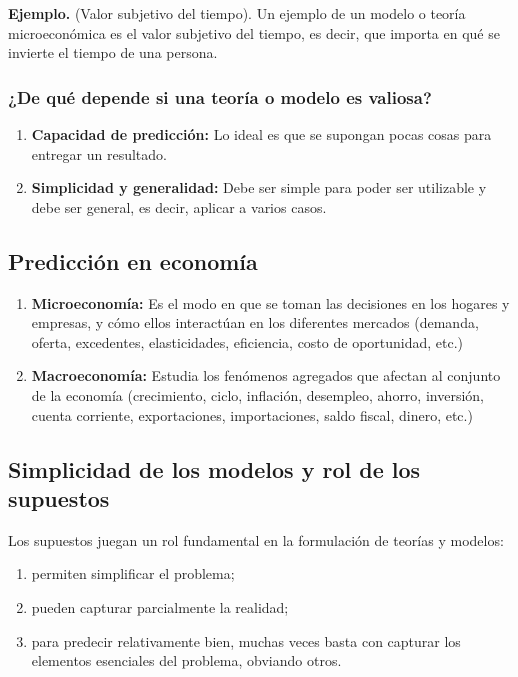 \documentclass{report}
\newenvironment{example}[1]{\noindent\setlength{\parskip}{0pt}\textbf{Ejemplo.} (#1).}{}
\begin{document}
\begin{example}{Valor subjetivo del tiempo}
Un ejemplo de un modelo o teoría microeconómica es el valor subjetivo del tiempo, es decir, que importa en qué se invierte el tiempo de una persona.
\end{example}

\subsubsection{¿De qué depende si una teoría o modelo es valiosa?}

\begin{enumerate}
\item \textbf{Capacidad de predicción:} Lo ideal es que se supongan pocas cosas para entregar un resultado.
\item \textbf{Simplicidad y generalidad:} Debe ser simple para poder ser utilizable y debe ser general, es decir, aplicar a varios casos.
\end{enumerate}

\subsection{Predicción en economía}

\begin{enumerate}
\item \textbf{Microeconomía:} Es el modo en que se toman las decisiones en los hogares y empresas, y cómo ellos interactúan en los diferentes mercados (demanda, oferta, excedentes, elasticidades, eficiencia, costo de oportunidad, etc.)
\item \textbf{Macroeconomía:} Estudia los fenómenos agregados que afectan al conjunto de la economía (crecimiento, ciclo, inflación, desempleo, ahorro, inversión, cuenta corriente, exportaciones, importaciones, saldo fiscal, dinero, etc.)
\end{enumerate}

\subsection{Simplicidad de los modelos y rol de los supuestos}

Los supuestos juegan un rol fundamental en la formulación de teorías y modelos:
\setlength{\parskip}{0cm}
\begin{enumerate}
\item permiten simplificar el problema;
\item pueden capturar parcialmente la realidad;
\item para predecir relativamente bien, muchas veces basta con capturar los elementos esenciales del problema, obviando otros.
\end{enumerate}
\setlength{\parskip}{0.25cm}
\end{document}

